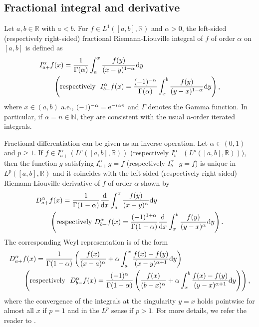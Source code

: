 \documentclass[12pt]{article}
\def\R{\mathbb R}
\def\N{\mathbb N}
\def\d{\text{\rm{d}}}
\def\e{\text{\rm{e}}}
\numberwithin{equation}{section}
\begin{document}
	\subsection{Fractional integral and derivative}
	
	Let $a,b\in\R$ with $a<b$.
	For $f\in L^1([a,b],\R)$ and $\alpha>0$, the left-sided (respectively right-sided) fractional Riemann-Liouville integral of $f$ of order $\alpha$
	on $[a,b]$ is defined as
	\begin{align}\label{FrIn}
		&I_{a+}^\alpha f(x)=\frac{1}{\Gamma(\alpha)}\int_a^x\frac{f(y)}{(x-y)^{1-\alpha}}\d y\\
		&\qquad\left(\mbox{respectively}\ \ I_{b-}^\alpha f(x)=\frac{(-1)^{-\alpha}}{\Gamma(\alpha)}\int_x^b\frac{f(y)}{(y-x)^{1-\alpha}}\d y\right),\nonumber
	\end{align}
	where $x\in(a,b)$ a.e., $(-1)^{-\alpha}=\e^{-i\alpha\pi}$ and $\Gamma$ denotes the Gamma function.
	In particular, if $\alpha=n\in\N$, they are consistent with the usual $n$-order iterated integrals.
	
	Fractional differentiation can be given as an inverse operation.
	Let $\alpha\in(0,1)$ and $p\geq1$.
	If $f\in I_{a+}^\alpha(L^p([a,b],\R))$ (respectively $I_{b-}^\alpha(L^p([a,b],\R)))$, then the function $g$ satisfying $I_{a+}^\alpha g=f$ (respectively $I_{b-}^\alpha g=f$) is unique in $L^p([a,b],\R)$ and it coincides with the left-sided (respectively right-sided) Riemann-Liouville derivative
	of $f$ of order $\alpha$ shown by
	\begin{align*}
		&D_{a+}^\alpha f(x)=\frac{1}{\Gamma(1-\alpha)}\frac{\d}{\d x}\int_a^x\frac{f(y)}{(x-y)^\alpha}\d y\\
		&\qquad\left(\mbox{respectively}\ D_{b-}^\alpha f(x)=\frac{(-1)^{1+\alpha}}{\Gamma(1-\alpha)}\frac{\d}{\d x}\int_x^b\frac{f(y)}{(y-x)^\alpha}\d y\right).
	\end{align*}
	The corresponding Weyl representation is of the form
	\begin{align}\label{FrDe}
		&D_{a+}^\alpha f(x)=\frac{1}{\Gamma(1-\alpha)}\left(\frac{f(x)}{(x-a)^\alpha}+\alpha\int_a^x\frac{f(x)-f(y)}{(x-y)^{\alpha+1}}\d y\right)\\
		&\qquad\left(\mbox{respectively}\ \ D_{b-}^\alpha f(x)=\frac{(-1)^\alpha}{\Gamma(1-\alpha)}\left(\frac{f(x)}{(b-x)^\alpha}+\alpha\int_x^b\frac{f(x)-f(y)}{(y-x)^{\alpha+1}}\d y\right)\right),\nonumber
	\end{align}
	where the convergence of the integrals at the singularity $y=x$ holds pointwise for almost all $x$ if $p=1$ and in the $L^p$ sense if $p>1$.
	For more details, we refer the reader to \cite{SKM93}.
	
\end{document}
